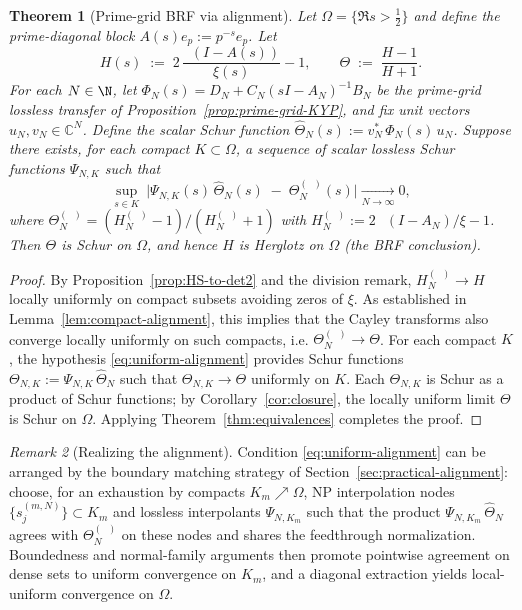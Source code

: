\documentclass[11pt]{article}
\newtheorem{theorem}{Theorem}
\theoremstyle{remark}
\newtheorem{remark}[theorem]{Remark}
\newcommand{\C}{\mathbb{C}}
\DeclareMathOperator{\dettwo}{det_2}
\begin{document}
\begin{theorem}[Prime-grid BRF via alignment]\label{thm:prime-grid-BRF}
Let \(\Omega=\{\Re s>\tfrac12\}\) and define the prime-diagonal block \(A(s)e_p:=p^{-s}e_p\). Let
\[
 H(s)\;:=\;2\,\frac{\dettwo(I-A(s))}{\xi(s)}-1,\qquad \Theta\;:=\;\frac{H-1}{H+1}.
\]
For each \(N\in\N\), let \(\Phi_N(s)=D_N+C_N(sI-A_N)^{-1}B_N\) be the prime-grid lossless transfer of Proposition~\ref{prop:prime-grid-KYP}, and fix unit vectors \(u_N,v_N\in\C^N\). Define the scalar Schur function \(\widehat\Theta_N(s):=v_N^*\,\Phi_N(s)\,u_N\). Suppose there exists, for each compact \(K\subset\Omega\), a sequence of scalar lossless Schur functions \(\Psi_{N,K}\) such that
\begin{equation}\label{eq:uniform-alignment}
 \sup_{s\in K}\ \big|\Psi_{N,K}(s)\,\widehat\Theta_N(s)\; -\; \Theta_N^{(\dettwo)}(s)\big|\xrightarrow[N\to\infty]{}0,
\end{equation}
where \(\Theta_N^{(\dettwo)}=(H_N^{(\dettwo)}-1)/(H_N^{(\dettwo)}+1)\) with \(H_N^{(\dettwo)}:=2\,\dettwo(I-A_N)/\xi-1\). Then \(\Theta\) is Schur on \(\Omega\), and hence \(H\) is Herglotz on \(\Omega\) (the BRF conclusion).
\end{theorem}
\begin{proof}
By Proposition~\ref{prop:HS-to-det2} and the division remark, \(H_N^{(\dettwo)}\to H\) locally uniformly on compact subsets avoiding zeros of \(\xi\). As established in Lemma~\ref{lem:compact-alignment}, this implies that the Cayley transforms also converge locally uniformly on such compacts, i.e. \(\Theta_N^{(\dettwo)}\to\Theta\). For each compact \(K\), the hypothesis \eqref{eq:uniform-alignment} provides Schur functions \(\Theta_{N,K}:=\Psi_{N,K}\,\widehat\Theta_N\) such that \(\Theta_{N,K}\to\Theta\) uniformly on \(K\). Each \(\Theta_{N,K}\) is Schur as a product of Schur functions; by Corollary~\ref{cor:closure}, the locally uniform limit \(\Theta\) is Schur on \(\Omega\). Applying Theorem~\ref{thm:equivalences} completes the proof.
\end{proof}
\begin{remark}[Realizing the alignment]
Condition \eqref{eq:uniform-alignment} can be arranged by the boundary matching strategy of Section~\ref{sec:practical-alignment}: choose, for an exhaustion by compacts \(K_m\nearrow\Omega\), NP interpolation nodes \(\{s_{j}^{(m,N)}\}\subset K_m\) and lossless interpolants \(\Psi_{N,K_m}\) such that the product \(\Psi_{N,K_m}\,\widehat\Theta_N\) agrees with \(\Theta_N^{(\dettwo)}\) on these nodes and shares the feedthrough normalization. Boundedness and normal-family arguments then promote pointwise agreement on dense sets to uniform convergence on \(K_m\), and a diagonal extraction yields local-uniform convergence on \(\Omega\).
\end{remark}
\end{document}
